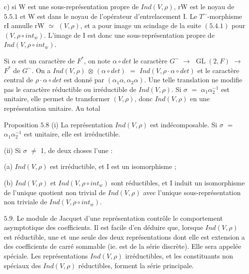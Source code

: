 \documentclass[10pt,a4paper]{article}
\begin{document}
\clearpage
{}
\label{d035-physical-024}
\par c) si W est une sous-représentation propre de $Ind(V,\rho{})$, rW est le noyau de $5.5.1$ et W est dans le noyau de l'opérateur d'entrelacement I. Le $T^\sim$-morphisme rI annulle rW $\simeq{}$ $(V,\rho{})$, et a pour image un scindage de la suite $(5.4.1)$ pour $(V,\rho{}∘int_w)$. L'image de I est donc une sous-représentation propre de $Ind(V,\rho{}∘int_w)$.\par
\par Si $\alpha{}$ est un caractère de $F^*$, on note $\alpha{}∘det$ le caractère $G^\sim$ $\to{}$ $\operatorname{GL}(2,F)$ $\to{}$ $F^*$ de $G^\sim$. On a $Ind(V,\rho{})$ $\otimes{}$ $(\alpha{}∘det)$ $=$ $Ind(V,\rho{}\cdot{}\alpha{}∘det)$ et le caractère central de $\rho{}\cdot{}\alpha{}∘det$ est donné par $(\alpha{}_1\alpha{},\alpha{}_2\alpha{})$. Une telle translation ne modifie pas le caractère réductible ou irréductible de $Ind(V,\rho{})$. Si $\sigma{}$ $=$ $\alpha{}_1\alpha{}_2^{-1}$ est unitaire, elle permet de transformer $(V,\rho{})$, donc $Ind(V,\rho{})$ en une représentation unitaire. Au total\par
\par Proposition $5.8$ (i) La représentation $Ind(V,\rho{})$ est indécomposable. Si $\sigma{}$ $=$ $\alpha{}_1\alpha{}_2^{-1}$ est unitaire, elle est irréductible.\par
\par (ii) Si $\sigma{}$ $\ne{}$ 1, de deux choses l'une :\par
\par (a) $Ind(V,\rho{})$ est irréductible, et I est un isomorphisme ;\par
\par (b) $Ind(V,\rho{})$ et $Ind(V,\rho{}∘int_w)$ sont réductibles, et I induit un isomorphisme de l'unique quotient non trivial de $Ind(V,\rho{})$ avec l'unique sous-représentation non triviale de $Ind(V,\rho{}∘int_w)$.\par
\par $5.9$. Le module de Jacquet d'une représentation contrôle le comportement asymptotique des coefficients. Il est facile d'en déduire que, lorsque $Ind(V,\rho{})$ est réductible, une et une seule des deux représentations dont elle est extension a des coefficients de carré sommable (ie. est de la série discrète). Elle sera appelée spéciale. Les représentations $Ind(V,\rho{})$ irréductibles, et les constituants non spéciaux des $Ind(V,\rho{})$ réductibles, forment la série principale.\par
\end{document}
